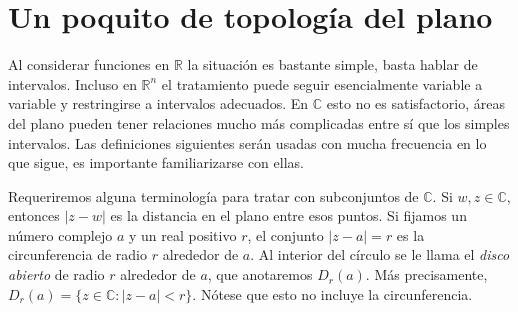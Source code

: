 \section{Un poquito de topología del plano}
\label{sec:topologia}

  Al considerar funciones en \(\mathbb{R}\)
  la situación es bastante simple,
  basta hablar de intervalos.
  Incluso en \(\mathbb{R}^n\)
  el tratamiento puede seguir esencialmente
  variable a variable
  y restringirse a intervalos adecuados.
  En \(\mathbb{C}\) esto no es satisfactorio,
  áreas del plano
  pueden tener relaciones mucho más complicadas entre sí
  que los simples intervalos.
  Las definiciones siguientes
  serán usadas con mucha frecuencia en lo que sigue,
  es importante familiarizarse con ellas.

  Requeriremos alguna terminología
  para tratar con subconjuntos de \(\mathbb{C}\).
  Si \(w, z \in \mathbb{C}\),
  entonces \(\lvert z - w \rvert\) es la distancia en el plano
  entre esos puntos.
  Si fijamos un número complejo \(a\) y un real positivo \(r\),
  el conjunto \(\lvert z - a \rvert = r\)
  es la circunferencia de radio \(r\) alrededor de \(a\).
  Al interior del círculo
  se le llama el \emph{disco abierto} de radio \(r\)%
  alrededor de \(a\),
  que anotaremos \(D_r(a)\).
  Más precisamente,
  \(D_r(a) = \{z \in \mathbb{C} \colon \lvert z - a \rvert < r\}\).
  Nótese que esto no incluye la circunferencia.

